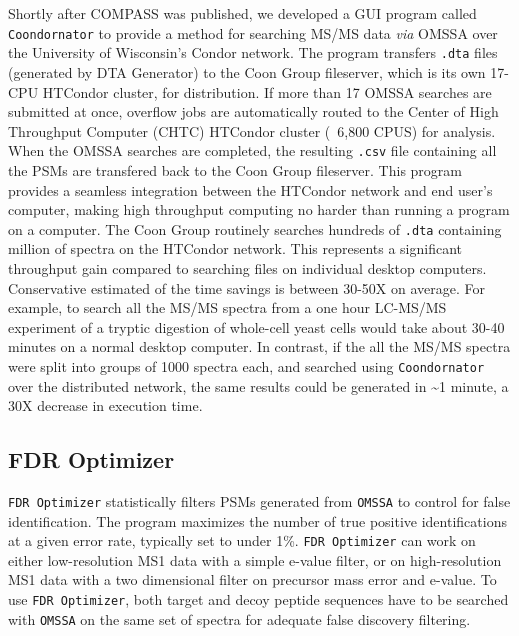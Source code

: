 Shortly after COMPASS was published, we developed a GUI program called \texttt{Coondornator} to provide a method for searching MS/MS data \emph{via} OMSSA over the University of Wisconsin's Condor network. The program transfers \texttt{.dta} files (generated by DTA Generator) to the Coon Group fileserver, which is its own 17-CPU HTCondor cluster, for distribution. If more than 17 OMSSA searches are submitted at once, overflow jobs are automatically routed to the Center of High Throughput Computer (CHTC) HTCondor cluster (~6,800 CPUS) for analysis. When the OMSSA searches are completed, the resulting \texttt{.csv} file containing all the PSMs are transfered back to the Coon Group fileserver. This program provides a seamless integration between the HTCondor network and end user's computer, making high throughput computing no harder than running a program on a computer. The Coon Group routinely searches hundreds of \texttt{.dta} containing million of spectra on the HTCondor network. This represents a significant throughput gain compared to searching files on individual desktop computers. Conservative estimated of the time savings is between 30-50X on average. For example, to search all the MS/MS spectra from a one hour LC-MS/MS experiment of a tryptic digestion of whole-cell yeast cells would take about 30-40 minutes on a normal desktop computer. In contrast, if the all the MS/MS spectra were split into groups of 1000 spectra each, and searched using \texttt{Coondornator} over the distributed network, the same results could be generated in \textasciitilde1 minute, a 30X decrease in execution time.

\subsection*{FDR Optimizer}
\texttt{FDR Optimizer} statistically filters PSMs generated from \texttt{OMSSA} to control for false identification. The program maximizes the number of true positive identifications at a given error rate, typically set to under 1\%. \texttt{FDR Optimizer} can work on either low-resolution MS1 data with a simple e-value filter, or on high-resolution MS1 data with a two dimensional filter on precursor mass error and e-value. To use \texttt{FDR Optimizer}, both target and decoy peptide sequences have to be searched with \texttt{OMSSA} on the same set of spectra for adequate false discovery filtering. 

